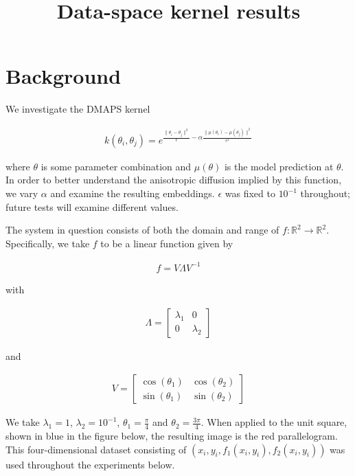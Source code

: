 \documentclass[11pt]{article}
\title{Data-space kernel results}
\begin{document}
\maketitle

\section{Background}

We investigate the DMAPS kernel

\begin{align*}
  k(\theta_i, \theta_j) = e^{\frac{\|\theta_i - \theta_j\|^2}{\epsilon} - \alpha \frac{\|\mu(\theta_i) - \mu(\theta_j)\|^2}{\epsilon^2}}
\end{align*}

where $\theta$ is some parameter combination and $\mu(\theta)$ is the
model prediction at $\theta$. In order to better understand the
anisotropic diffusion implied by this function, we vary $\alpha$ and
examine the resulting embeddings. $\epsilon$ was fixed to $10^{-1}$
throughout; future tests will examine different values.

The system in question consists of both the domain and range of $f:
\mathbb{R}^2 \rightarrow \mathbb{R}^2$. Specifically, we take $f$ to
be a linear function given by

\begin{align*}
  f = V \Lambda V^{-1}
\end{align*}

with

\begin{align*}
  \Lambda = \begin{bmatrix} \lambda_1 & 0 \\ 0 & \lambda_2 \end{bmatrix}
\end{align*}
  
and

\begin{align*}
  V = \begin{bmatrix} \cos(\theta_1) & \cos(\theta_2) \\ \sin(\theta_1)
    & \sin(\theta_2) \end{bmatrix}
\end{align*}

We take $\lambda_1 = 1$, $\lambda_2 = 10^{-1}$, $\theta_1 =
\frac{\pi}{4}$ and $\theta_2 = \frac{3\pi}{4}$. When applied to the
unit square, shown in blue in the figure below, the resulting image is
the red parallelogram. This four-dimensional dataset consisting of
$(x_i, y_i, f_1(x_i, y_i), f_2(x_i, y_i))$ was used throughout the
experiments below.
\end{document}
